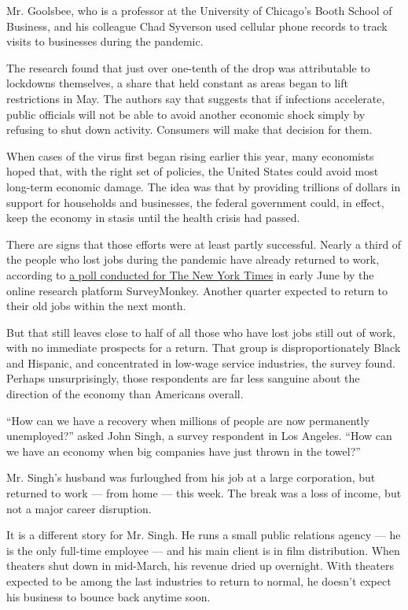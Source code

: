 Mr. Goolsbee, who is a professor at the University of Chicago's Booth
School of Business, and his colleague Chad Syverson used cellular phone
records to track visits to businesses during the pandemic.

The research found that just over one-tenth of the drop was attributable
to lockdowns themselves, a share that held constant as areas began to
lift restrictions in May. The authors say that suggests that if
infections accelerate, public officials will not be able to avoid
another economic shock simply by refusing to shut down activity.
Consumers will make that decision for them.

When cases of the virus first began rising earlier this year, many
economists hoped that, with the right set of policies, the United States
could avoid most long-term economic damage. The idea was that by
providing trillions of dollars in support for households and businesses,
the federal government could, in effect, keep the economy in stasis
until the health crisis had passed.

There are signs that those efforts were at least partly successful.
Nearly a third of the people who lost jobs during the pandemic have
already returned to work, according to
\href{https://www.surveymonkey.com/curiosity/nyt-june-2020-cci/}{a poll
conducted for The New York Times} in early June by the online research
platform SurveyMonkey. Another quarter expected to return to their old
jobs within the next month.

But that still leaves close to half of all those who have lost jobs
still out of work, with no immediate prospects for a return. That group
is disproportionately Black and Hispanic, and concentrated in low-wage
service industries, the survey found. Perhaps unsurprisingly, those
respondents are far less sanguine about the direction of the economy
than Americans overall.

``How can we have a recovery when millions of people are now permanently
unemployed?'' asked John Singh, a survey respondent in Los Angeles.
``How can we have an economy when big companies have just thrown in the
towel?''

Mr. Singh's husband was furloughed from his job at a large corporation,
but returned to work --- from home --- this week. The break was a loss
of income, but not a major career disruption.

It is a different story for Mr. Singh. He runs a small public relations
agency --- he is the only full-time employee --- and his main client is
in film distribution. When theaters shut down in mid-March, his revenue
dried up overnight. With theaters expected to be among the last
industries to return to normal, he doesn't expect his business to bounce
back anytime soon.

